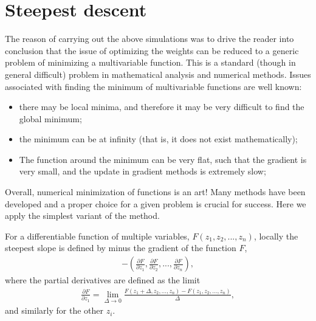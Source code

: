 \documentclass[a4paper,12pt,polish]{jupyterBook}
\begin{document}
\section{Steepest descent}
\label{\detokenize{docs/backprop:steepest-descent}}
\sphinxAtStartPar
The reason of carrying out the above simulations was to drive the reader into conclusion that the issue of optimizing the weights can be reduced to a generic problem of minimizing a multi\sphinxhyphen{}variable function. This is a standard (though in general difficult) problem in mathematical analysis and numerical methods. Issues associated with finding the minimum of multivariable functions are well known:
\begin{itemize}
\item {} 
\sphinxAtStartPar
there may be local minima, and therefore it may be very difficult to find the global minimum;

\item {} 
\sphinxAtStartPar
the minimum can be at infinity (that is, it does not exist mathematically);

\item {} 
\sphinxAtStartPar
The function around the minimum can be very flat, such that the gradient is very small, and the update in gradient methods is extremely slow;

\end{itemize}

\sphinxAtStartPar
Overall, numerical minimization of functions is an art! Many methods have been developed and a proper choice for a given problem is crucial for success. Here we apply the simplest variant of the  method.

\sphinxAtStartPar
For a differentiable function of multiple variables, \( F (z_1, z_2, ..., z_n) \), locally the steepest slope is defined by minus the gradient of the function \( F \),
\begin{equation*}
\begin{split}-\left (\frac{\partial F}{\partial z_1}, \frac{\partial F}{\partial z_2}, ..., 
\frac{\partial F}{\partial z_n} \right ), \end{split}
\end{equation*}
\sphinxAtStartPar
where the partial derivatives are defined as the limit
\begin{equation*}
\begin{split}\frac{\partial F}{\partial z_1} =  \lim _ {\Delta \to 0} \frac {F (z_1 + \Delta, z_2, ..., z_n) -F (z_1, z_2, ..., z_n)} { \Delta}, \end{split}
\end{equation*}
\sphinxAtStartPar
and similarly for the other \( z_i \).
\end{document}
